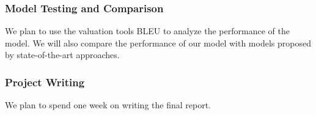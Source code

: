 \subsubsection{Model Testing and Comparison}
We plan to use the valuation tools BLEU \cite{papineni2002bleu} to analyze the performance of the model. We will also compare the performance of our model with models proposed by state-of-the-art approaches.

\subsubsection{Project Writing} We plan to spend one week on writing  the final report.




